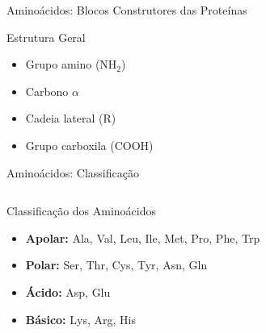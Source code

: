 \begin{frame}{Aminoácidos: Blocos Construtores das Proteínas}
\begin{block}{Estrutura Geral}
\begin{center}
\end{center}
\begin{itemize}
    \item Grupo amino (NH$_2$)
    \item Carbono $\alpha$
    \item Cadeia lateral (R)
    \item Grupo carboxila (COOH)
\end{itemize}
\end{block}

\end{frame}

\begin{frame}[allowframebreaks]{Aminoácidos: Classificação}
\begin{columns}
\begin{exampleblock}{Classificação dos Aminoácidos}
\begin{itemize}
    \item \textbf{Apolar:} Ala, Val, Leu, Ile, Met, Pro, Phe, Trp
    \item \textbf{Polar:} Ser, Thr, Cys, Tyr, Asn, Gln
    \item \textbf{Ácido:} Asp, Glu
    \item \textbf{Básico:} Lys, Arg, His
\end{itemize}
\end{exampleblock}
\end{columns}

\vspace{0.3cm}

\end{frame}

